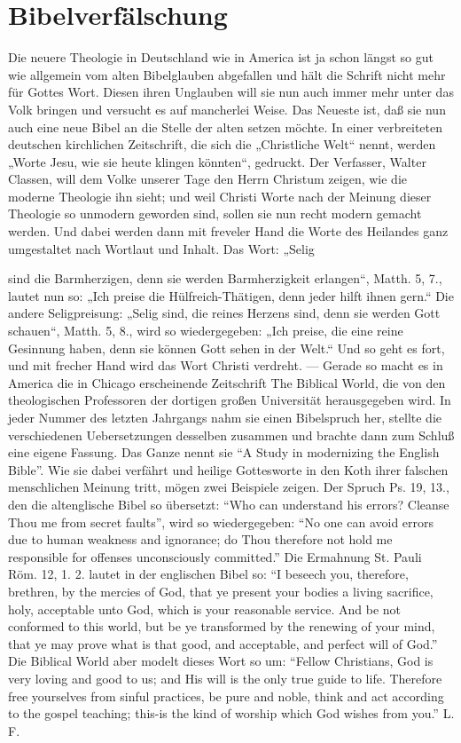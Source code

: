 \chapter[Bibelverfälschung]{Bibelverfälschung}
Die neuere Theologie in Deutschland wie in America ist ja schon längst so gut wie allgemein vom alten Bibelglauben abgefallen und hält die Schrift nicht mehr für Gottes Wort. Diesen ihren Unglauben will sie nun auch immer mehr unter das Volk bringen und versucht es auf mancherlei Weise. Das Neueste ist, daß sie nun auch eine neue Bibel an die Stelle der alten setzen möchte. In einer verbreiteten deutschen kirchlichen Zeitschrift, die sich die „Christliche Welt“ nennt, werden „Worte Jesu, wie sie heute klingen könnten“, gedruckt. Der Verfasser, Walter Classen, will dem Volke unserer Tage den Herrn Christum zeigen, wie die moderne Theologie ihn sieht; und weil Christi Worte nach der Meinung dieser Theologie so unmodern geworden sind, sollen sie nun recht modern gemacht werden. Und dabei werden dann mit freveler Hand die Worte des Heilandes ganz umgestaltet nach Wortlaut und Inhalt. Das Wort: „Selig

sind die Barmherzigen, denn sie werden Barmherzigkeit erlangen“, Matth. 5, 7., lautet nun so: „Ich preise die Hülfreich-Thätigen, denn jeder hilft ihnen gern.“ Die andere Seligpreisung: „Selig sind, die reines Herzens sind, denn sie werden Gott schauen“, Matth. 5, 8., wird so wiedergegeben: „Ich preise, die eine reine Gesinnung haben, denn sie können Gott sehen in der Welt.“ Und so geht es fort, und mit frecher Hand wird das Wort Christi verdreht. — Gerade so macht es in America die in Chicago erscheinende Zeitschrift The Biblical World, die von den theologischen Professoren der dortigen großen Universität herausgegeben wird. In jeder Nummer des letzten Jahrgangs nahm sie einen Bibelspruch her, stellte die verschiedenen Uebersetzungen desselben zusammen und brachte dann zum Schluß eine eigene Fassung. Das Ganze nennt sie “A Study in modernizing the English Bible”. Wie sie dabei verfährt und heilige Gottesworte in den Koth ihrer falschen menschlichen Meinung tritt, mögen zwei Beispiele zeigen. Der Spruch Ps. 19, 13., den die altenglische Bibel so übersetzt: “Who can understand his errors? Cleanse Thou me from secret faults”, wird so wiedergegeben: “No one can avoid errors due to human weakness and ignorance; do Thou therefore not hold me responsible for offenses unconsciously committed.” Die Ermahnung St. Pauli Röm. 12, 1. 2. lautet in der englischen Bibel so: “I beseech you, therefore, brethren, by the mercies of God, that ye present your bodies a living sacrifice, holy, acceptable unto God, which is your reasonable service. And be not conformed to this world, but be ye transformed by the renewing of your mind, that ye may prove what is that good, and acceptable, and perfect will of God.” Die Biblical World aber modelt dieses Wort so um: “Fellow Christians, God is very loving and good to us; and His will is the only true guide to life. Therefore free yourselves from sinful practices, be pure and noble, think and act according to the gospel teaching; this-is the kind of worship which God wishes from you.” L. F.
